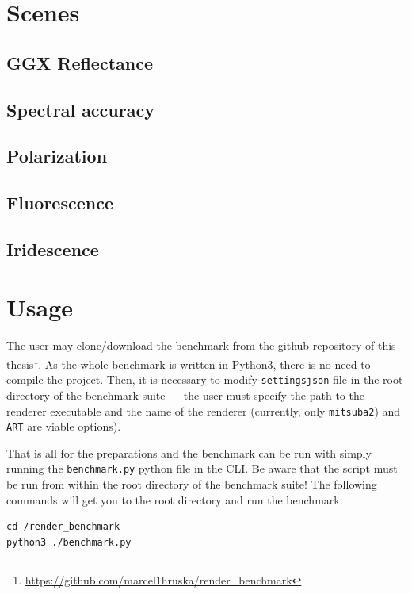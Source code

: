 \section{Scenes}
\label{sec:scenes}

\subsection{GGX Reflectance}

\subsection{Spectral accuracy}

\subsection{Polarization}

\subsection{Fluorescence}

\subsection{Iridescence}

\section{Usage}

The user may clone/download the benchmark from the github repository of this thesis\footnote{\url{https://github.com/marcel1hruska/render_benchmark}}. As the whole benchmark is written in Python3, there is no need to compile the project. Then, it is necessary to modify \texttt{settings\.json} file in the root directory of the benchmark suite --- the user must specify the path to the renderer executable and the name of the renderer (currently, only \texttt{mitsuba2}) and \texttt{ART} are viable options).

That is all for the preparations and the benchmark can be run with simply running the \texttt{benchmark.py} python file in the CLI. Be aware that the script must be run from within the root directory of the benchmark suite! The following commands will get you to the root directory and run the benchmark.

\begin{lstlisting}
cd /render_benchmark
python3 ./benchmark.py
\end{lstlisting}


